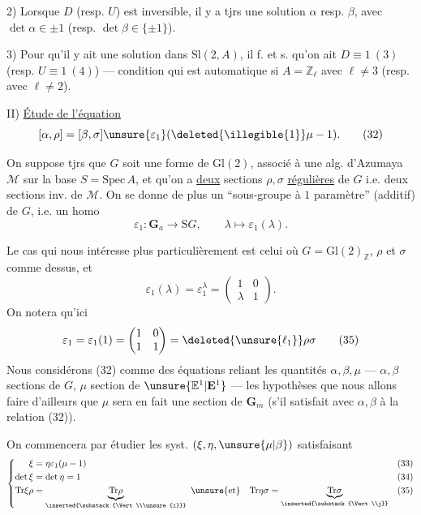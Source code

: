 2) Lorsque $D$ (resp. $U$) est inversible, il y a tjrs une solution $\alpha$ resp. $\beta$, avec $\det\alpha\in\pm1$ (resp. $\det\beta\in\{\pm1\}$).

3) Pour qu'il y ait une solution dans $\mathrm{Sl}(2,A)$, il f. et s. qu'on ait $D\equiv1\ (3)$ (resp. $U\equiv1\ (4)$) --- condition qui est automatique si $A=\mathbb{Z}_\ell$ avec $\ell\ne3$ (resp. avec $\ell\ne2$).

II) \uline{Étude  de l'équation}
\[
[\alpha,\rho]=[\beta,\sigma]\unsure{\varepsilon_1}(\deleted{\illegible{1}}\mu-1). \tag{32}
\]

On suppose tjrs que $G$ soit une forme de $\mathrm{Gl}(2)$, associé à une alg. d'Azumaya $\mathcal M$ sur la base $S=\mathrm{Spec}\,A$, et qu'on a \uline{deux} sections $\rho,\sigma$ \uline{régulières} de $G$ i.e. deux sections inv. de $\mathcal M$. On se donne de plus un ``sous-groupe à $1$ paramètre'' (additif) de $G$, i.e. un homo
\[
\varepsilon_1:\mathbf G_a\longrightarrow \mathrm{S}G,\qquad \lambda\longmapsto\varepsilon_1(\lambda). \tag{33}
\]


Le cas qui nous intéresse plus particulièrement est celui où $G=\mathrm{Gl}(2)_{\mathbb{Z}}$, $\rho$ et $\sigma$ comme dessus, et
\[
\varepsilon_1(\lambda)=\varepsilon_1^\lambda=\begin{pmatrix}1&0\\\lambda&1\end{pmatrix}. \tag{34}
\]
On notera qu'ici
\[
\varepsilon_1=\varepsilon_1(1)=\begin{pmatrix}1&0\\1&1\end{pmatrix}=\deleted{\unsure{\ell_1}}\rho\sigma \tag{35}
\]
Nous considérons (32) comme des équations reliant les quantités $\alpha,\beta,\mu$ --- $\alpha,\beta$ sections  de $G$, $\mu$ section de $\unsure{\mathbb E^1|\mathbf E^1}$ --- les hypothèses que nous allons faire  d'ailleurs que $\mu$ sera en fait une section de $\mathbf G_m$ (s'il satisfait avec $\alpha,\beta$ à la relation (32)). 

On commencera par étudier les syst.  $(\xi,\eta,\unsure{\mu|\beta})$ satisfaisant
\[
\left\{\begin{aligned}
\xi&=\eta\varepsilon_1(\mu-1) && (33)\\
\det\xi&=\det\eta=1 && (34)\\
\mathrm{Tr}\xi\rho&=\underbrace{\mathrm{Tr}\rho}_{\inserted{\substack{\Vert\\\unsure{i}}}}\ \unsure{\text{et}}\quad
\mathrm{Tr}\eta\sigma=\underbrace{\mathrm{Tr}\sigma}_{\inserted{\substack{\Vert\\j}}} && (35)
\end{aligned}\right.
\]

